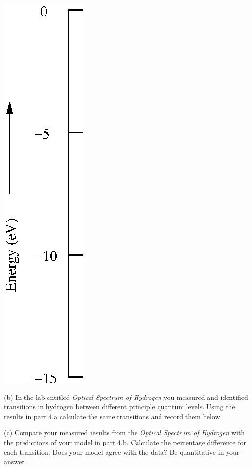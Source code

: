 \hspace{1.0cm}\includegraphics{solveSE/energyLevels.eps}

\vspace{0.75in}

(b) In the lab entitled {\it Optical Spectrum of Hydrogen}
you measured and identified transitions in hydrogen between different
principle quantum levels.
Using the results in part 4.a calculate the same transitions and record them below.
\vspace{4.0cm}

(c) Compare your measured results from the {\it Optical Spectrum of Hydrogen}
with the predictions of your model in part 4.b.
Calculate the percentage difference for each transition.
Does your model agree with the data?
Be quantitative in your answer.
\vspace{3.0cm}


